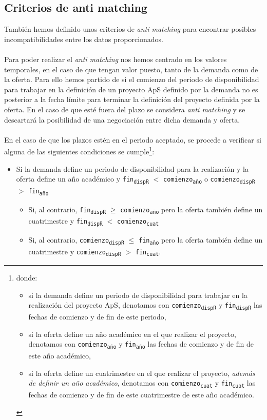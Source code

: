 \documentclass[11pt]{book}
\begin{document}
	\subsection{Criterios de anti matching }
	También hemos definido unos criterios de \emph{anti matching} para encontrar posibles incompatibilidades entre los datos proporcionados.\\\\
	Para poder realizar el \emph{anti matching} nos hemos centrado en los valores temporales, en el caso de que tengan valor puesto, tanto de la demanda como de la oferta. Para ello hemos partido de si el comienzo del periodo de disponibilidad para trabajar en la definición
	de un proyecto ApS definido por la demanda no es posterior a la fecha límite para terminar la
	definición del proyecto definida por la oferta. En el caso de que esté fuera del plazo se considera \emph{anti matching} y se descartará la posibilidad de una negociación entre dicha demanda y oferta. \\\\
	En el caso de que los plazos estén en el periodo aceptado, se procede a
	verificar si alguna de las siguientes condiciones se
	cumple\footnote{donde:
		\begin{itemize}
			\item si la demanda define un periodo de disponibilidad para trabajar
			en la realización del proyecto ApS, denotamos con
			\texttt{comienzo\textsubscript{dispR}}
			y
			\texttt{fin\textsubscript{dispR}}
			las fechas de comienzo y de fin de este periodo,
			\item si la oferta define un año académico en el que realizar el
			proyecto, denotamos con
			\texttt{comienzo\textsubscript{año}}
			y
			\texttt{fin\textsubscript{año}}
			las fechas de comienzo y de fin de este año académico,
			\item si la oferta define un cuatrimestre en el que realizar el
			proyecto, \emph{además de definir un año académico}, denotamos con
			\texttt{comienzo\textsubscript{cuat}}
			y
			\texttt{fin\textsubscript{cuat}}
			las fechas de comienzo y de fin de este cuatrimestre de este año
			académico.
	\end{itemize} }:
	\begin{itemize}
		\item Si la demanda define un periodo de disponibilidad para la
		realización y la oferta define un año académico y
		\texttt{fin\textsubscript{dispR}}
		\(<\) \texttt{comienzo\textsubscript{año}}
		o
		\texttt{comienzo\textsubscript{dispR}}
		\(>\) \texttt{fin\textsubscript{año}}
		\begin{itemize}
			\item Si, al contrario,
			\texttt{fin\textsubscript{dispR}}
			\(\geq\) \texttt{comienzo\textsubscript{año}}
			pero la oferta también define un cuatrimestre y
			\texttt{fin\textsubscript{dispR}}
			\(<\) \texttt{comienzo\textsubscript{cuat}}
			\item Si, al contrario,
			\texttt{comienzo\textsubscript{dispR}}
			\(\leq\) \texttt{fin\textsubscript{año}}
			pero la oferta también define un cuatrimestre y
			\texttt{comienzo\textsubscript{dispR}}
			\(>\) \texttt{fin\textsubscript{cuat}}.
		\end{itemize}
	\end{itemize}
\end{document}
